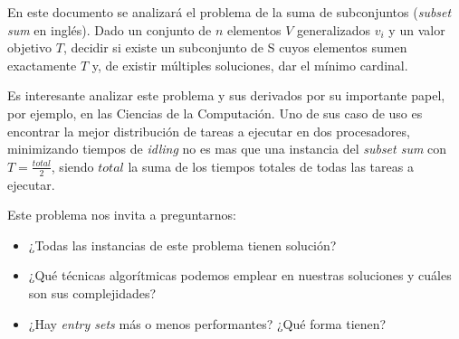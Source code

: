 En este documento se analizará el problema de la suma de subconjuntos (\textit{subset sum} en inglés). Dado un conjunto de $n$ elementos $V$ generalizados $v_{i}$ y un valor objetivo $T$, decidir si existe un subconjunto de S cuyos elementos sumen exactamente $T$ y, de existir múltiples soluciones, dar el mínimo cardinal.

\vskip 8pt

Es interesante analizar este problema y sus derivados por su importante papel, por ejemplo, en las Ciencias de la Computación. Uno de sus caso de uso es encontrar la mejor distribución de tareas a ejecutar en dos procesadores, minimizando tiempos de \textit{idling} no es mas que una instancia del \textit{subset sum} con $T = \frac{total}{2}$, siendo $total$ la suma de los tiempos totales de todas las tareas a ejecutar.

\vskip 8pt

Este problema nos invita a preguntarnos:
\begin{itemize}
	\item ¿Todas las instancias de este problema tienen solución?
	\item ¿Qué técnicas algorítmicas podemos emplear en nuestras soluciones y cuáles son sus complejidades?
	\item ¿Hay \textit{entry sets} más o menos performantes? ¿Qué forma tienen?
\end{itemize}
